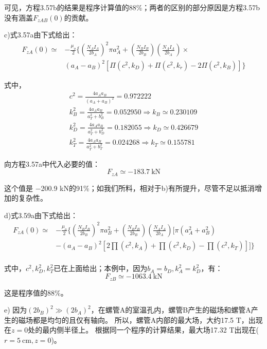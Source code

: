 可见，方程3.57b的结果是程序计算值的88\%；两者的区别的部分原因是方程3.57b没有涵盖$F_{zAB}(0)$的贡献。 

c)式3.57a由下式给出：
\begin{equation*}
\begin{split}
F_{zA}(0)\simeq&-\frac{\mu_{o}}{2}\{(\frac{N_{A}I_{A}}{2b_{A}})^{2}\pi a_{A}^{2}+(\frac{N_{B}I_{B}}{2b_{B}})(\frac{N_{A}I_{A}}{2b_{A}})\times\\
&(a_{A}-a_{B})^{2}[\Pi(c^{2},k_{D})+\Pi(c^{2},k_{r})-2\Pi(c^{2},k_{B})]\}
\end{split}\tag{3.57a}
\end{equation*}

式中，
\begin{eqnarray*}
c^2= \frac{4a_A a_B}{(a_A+a_B)^2}=0.972222\\
k_B^2=\frac{4a_A a_B}{a_T^2+b_B^2}=0.052950\Rightarrow k_B\simeq 0.230109\\
k_D^2=\frac{4a_A a_B}{a_T^2+b_D^2}=0.182055\Rightarrow k_D\simeq 0.426679\\
k_T^2=\frac{4a_A a_B}{a_T^2+b_T^2}=0.024268\Rightarrow k_T\simeq 0.155781
\end{eqnarray*}

向方程3.57a中代入必要的值：
\begin{equation*}
F_{zA}\simeq -183.7\ \mathrm{kN}
\end{equation*}

这个值是 −200.9 kN的91\%；如我们所料，相对于b)有所提升，尽管不足以抵消增加的复杂性。 

d)式3.59a由下式给出：
\begin{equation*}
\begin{split}
F_{zA}(0)\simeq&-\frac{\mu_{o}}{2}\bigg\{(\frac{N_{B}I_{B}}{2b_{B}})^{2}\pi a_{B}^{2}+(\frac{N_{B}I_{B}}{2b_{B}})(\frac{N_{A}I_{A}}{2b_{A}})[\pi(a_{A}^{2}+a_{B}^{2})\\
&-(a_{A}-a_{B})^{2}[2\prod(c^{2},k_{A})+\prod(c^{2},k_{D})-\prod(c^{2},k_{T})]]\bigg\}\\%
\end{split}\tag{3.59a}
\end{equation*}

式中，$c^2, k_D^2,k_T^2$已在上面给出；本例中，因为$b_A=b_D, k_A^2=k_D^2$，有：
\begin{equation*}
F_{zB}\simeq -1063.4\ \mathrm{kN}
\end{equation*}

这是程序值的88\%。

e) 因为$(2b_B)^2\gg (2b_A)^2$，在螺管A的室温孔内，螺管B产生的磁场和螺管A产生的磁场都是均匀的且仅有轴向。
所以，螺管A内部的最大场，大约17.5 T，出现在$z=0$处的最内侧半径上。
根据同一个程序的计算结果，最大场17.32 T出现在($r=5\ \mathrm{cm},z=0$)。

